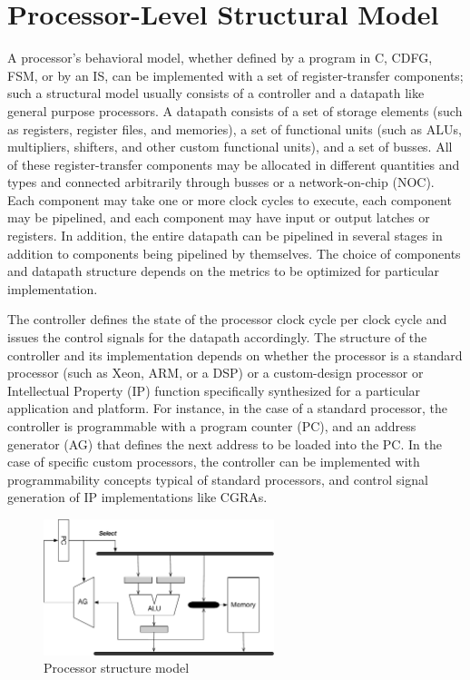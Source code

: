 \section{Processor-Level Structural Model}

A processor’s behavioral model, whether defined by a program in C, CDFG, FSM, or by an IS, can be implemented with a set of register-transfer components; such a structural model usually consists of a controller and a datapath like general purpose processors.
A datapath consists of a set of storage elements (such as registers, register files, and memories), a set of functional units (such as ALUs, multipliers, shifters, and other custom functional units), and a set of busses.
All of these register-transfer components may be allocated in different quantities and types and connected arbitrarily through busses or a network-on-chip (NOC).
Each component may take one or more clock cycles to execute, each component may be pipelined, and each component may have input or output latches or registers.
In addition, the entire datapath can be pipelined in several stages in addition to components being pipelined by themselves.
The choice of components and datapath structure depends on the metrics to be optimized for particular implementation.

The controller defines the state of the processor clock cycle per clock cycle and issues the control signals for the datapath accordingly.
The structure of the controller and its implementation depends on whether the processor is a standard processor (such as Xeon, ARM, or a DSP) or a custom-design processor or Intellectual Property (IP) function specifically synthesized for a particular application and platform.
For instance, in the case of a standard processor, the controller is programmable with a program counter (PC), and an address generator (AG) that defines the next address to be loaded into the PC.
In the case of specific custom processors, the controller can be implemented with programmability concepts typical of standard processors, and control signal generation of IP implementations like CGRAs.

\begin{figure}[h]
    \centering
    \includegraphics[width=0.6\textwidth]{figures/Introduction/Processor_Structure.pdf}
    \caption{Processor structure model}
    \label{fig:proc_structure}
\end{figure}




